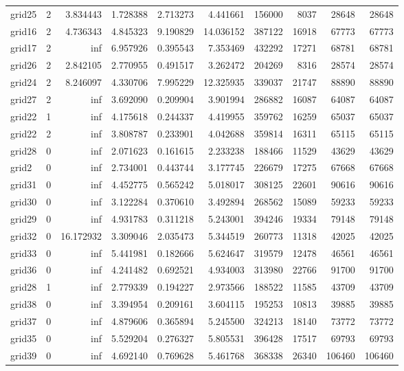 \begin{longtable}{|l|r|r|r|r|r|r|r|r|r|}
grid25 & 2 & 3.834443 & 1.728388 & 2.713273 & 4.441661 & 156000 & 8037 & 28648 & 28648 \\
grid16 & 2 & 4.736343 & 4.845323 & 9.190829 & 14.036152 & 387122 & 16918 & 67773 & 67773 \\
grid17 & 2 & inf & 6.957926 & 0.395543 & 7.353469 & 432292 & 17271 & 68781 & 68781 \\
grid26 & 2 & 2.842105 & 2.770955 & 0.491517 & 3.262472 & 204269 & 8316 & 28574 & 28574 \\
grid24 & 2 & 8.246097 & 4.330706 & 7.995229 & 12.325935 & 339037 & 21747 & 88890 & 88890 \\
grid27 & 2 & inf & 3.692090 & 0.209904 & 3.901994 & 286882 & 16087 & 64087 & 64087 \\
grid22 & 1 & inf & 4.175618 & 0.244337 & 4.419955 & 359762 & 16259 & 65037 & 65037 \\
grid22 & 2 & inf & 3.808787 & 0.233901 & 4.042688 & 359814 & 16311 & 65115 & 65115 \\
grid28 & 0 & inf & 2.071623 & 0.161615 & 2.233238 & 188466 & 11529 & 43629 & 43629 \\
grid2 & 0 & inf & 2.734001 & 0.443744 & 3.177745 & 226679 & 17275 & 67668 & 67668 \\
grid31 & 0 & inf & 4.452775 & 0.565242 & 5.018017 & 308125 & 22601 & 90616 & 90616 \\
grid30 & 0 & inf & 3.122284 & 0.370610 & 3.492894 & 268562 & 15089 & 59233 & 59233 \\
grid29 & 0 & inf & 4.931783 & 0.311218 & 5.243001 & 394246 & 19334 & 79148 & 79148 \\
grid32 & 0 & 16.172932 & 3.309046 & 2.035473 & 5.344519 & 260773 & 11318 & 42025 & 42025 \\
grid33 & 0 & inf & 5.441981 & 0.182666 & 5.624647 & 319579 & 12478 & 46561 & 46561 \\
grid36 & 0 & inf & 4.241482 & 0.692521 & 4.934003 & 313980 & 22766 & 91700 & 91700 \\
grid28 & 1 & inf & 2.779339 & 0.194227 & 2.973566 & 188522 & 11585 & 43709 & 43709 \\
grid38 & 0 & inf & 3.394954 & 0.209161 & 3.604115 & 195253 & 10813 & 39885 & 39885 \\
grid37 & 0 & inf & 4.879606 & 0.365894 & 5.245500 & 324213 & 18140 & 73772 & 73772 \\
grid35 & 0 & inf & 5.529204 & 0.276327 & 5.805531 & 396428 & 17517 & 69793 & 69793 \\
grid39 & 0 & inf & 4.692140 & 0.769628 & 5.461768 & 368338 & 26340 & 106460 & 106460 \\

\end{longtable}
